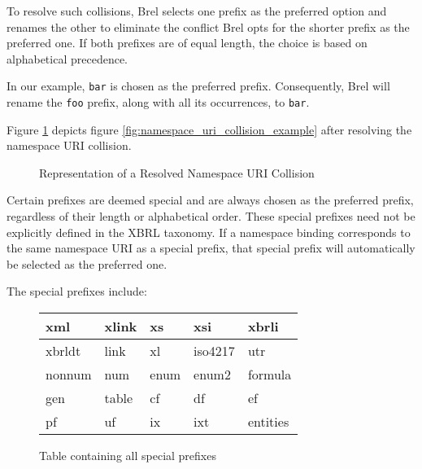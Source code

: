 To resolve such collisions, Brel selects one prefix as the preferred option and renames the other to eliminate the conflict
Brel opts for the shorter prefix as the preferred one.
If both prefixes are of equal length, the choice is based on alphabetical precedence.

In our example, \texttt{bar} is chosen as the preferred prefix.
Consequently, Brel will rename the \texttt{foo} prefix, along with all its occurrences, to \texttt{bar}.

Figure \ref{fig:namespace_uri_collision_example_renamed} depicts figure \ref{fig:namespace_uri_collision_example} after resolving the namespace URI collision.

\begin{figure}[H]
\caption{Representation of a Resolved Namespace URI Collision}
\label{fig:namespace_uri_collision_example_renamed}
\end{figure}

Certain prefixes are deemed special and are always chosen as the preferred prefix, regardless of their length or alphabetical order.
These special prefixes need not be explicitly defined in the XBRL taxonomy.
If a namespace binding corresponds to the same namespace URI as a special prefix, that special prefix will automatically be selected as the preferred one.

The special prefixes include:

\begin{figure}[H]
    \centering
    \begin{tabular}{|l|l|l|l|l|}
        \hline
        xml & xlink & xs & xsi & xbrli \\
        \hline
        xbrldt & link & xl & iso4217 & utr \\
        \hline
        nonnum & num & enum & enum2 & formula \\
        \hline
        gen & table & cf & df & ef \\
        \hline
        pf & uf & ix & ixt & entities \\
        \hline
    \end{tabular}
    \caption{Table containing all special prefixes}
    \label{fig:special_prefixes}
\end{figure}

